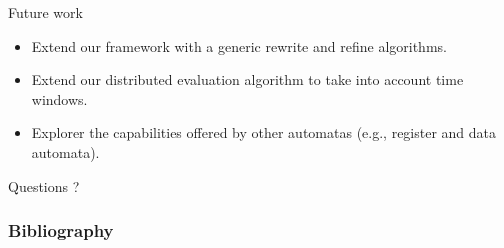 \documentclass[xcolor=pdftex,dvipsnames,table]{beamer}
\begin{document}

\begin{frame}{Future work}
  \begin{block}{}
   \begin{itemize}
     \item Extend our framework with a generic rewrite and refine algorithms.
     \pause
     \item Extend our distributed evaluation algorithm to take into account time windows.
     \pause
     \item Explorer the capabilities offered by other automatas (e.g., register and data automata).
   \end{itemize}
  \end{block}
\end{frame}


\begin{frame}[c]{ }
  \centering
  \huge Questions ?
\end{frame}


\begin{frame}[allowframebreaks]
  \frametitle{Bibliography}
  
  
\end{frame}
\end{document}
